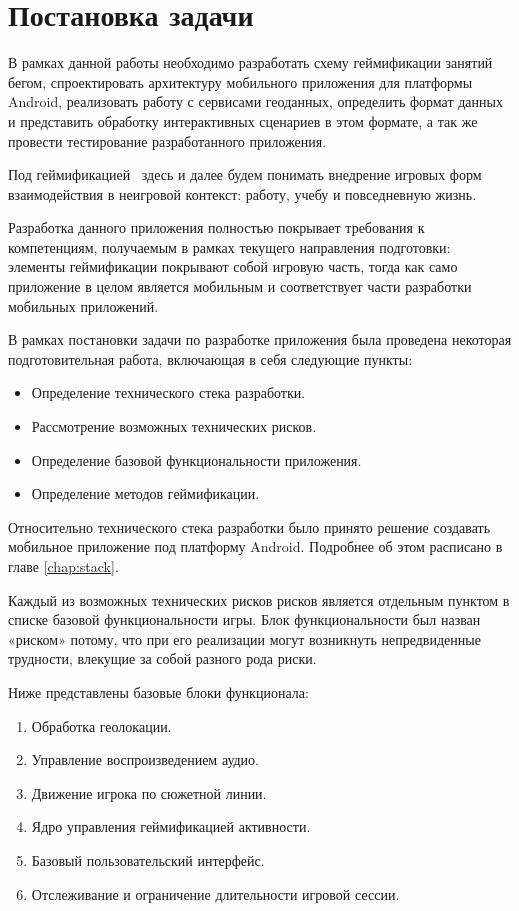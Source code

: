 \chapter{Постановка задачи}
В рамках данной работы необходимо разработать схему геймификации занятий бегом, спроектировать архитектуру мобильного приложения для платформы Android, реализовать работу с сервисами геоданных, определить формат данных и представить обработку интерактивных сценариев в этом формате, а так же провести тестирование разработанного приложения.

Под геймификацией~\autocite{gamification} здесь и далее будем понимать внедрение игровых форм взаимодействия в неигровой контекст: работу, учебу и повседневную жизнь.

Разработка данного приложения полностью покрывает требования к компетенциям, получаемым в рамках текущего направления подготовки: элементы геймификации покрывают собой игровую часть, тогда как само приложение в целом является мобильным и соответствует части разработки мобильных приложений.

В рамках постановки задачи по разработке приложения была проведена некоторая подготовительная работа, включающая в себя следующие пункты:
\begin{itemize}
	\item Определение технического стека разработки.
	\item Рассмотрение возможных технических рисков.
	\item Определение базовой функциональности приложения.
	\item Определение методов геймификации.
\end{itemize}

Относительно технического стека разработки было принято решение создавать мобильное приложение под платформу Android. Подробнее об этом расписано в главе \autoref{chap:stack}.


Каждый из возможных технических рисков рисков является отдельным пунктом в списке базовой функциональности игры. Блок функциональности был назван «риском» потому, что при его реализации могут возникнуть непредвиденные трудности, влекущие за собой разного рода риски.

Ниже представлены базовые блоки функционала:
\begin{enumerate}
	\item Обработка геолокации.
	\item Управление воспроизведением аудио.
	\item Движение игрока по сюжетной линии.
	\item Ядро управления геймификацией активности.
	\item Базовый пользовательский интерфейс.
	\item Отслеживание и ограничение длительности игровой сессии.
\end{enumerate}

